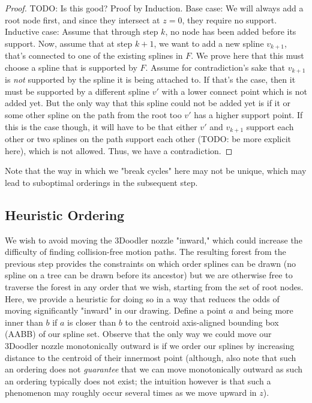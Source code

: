 \documentclass[conference]{acmsiggraph}
\begin{document}
\begin{proof}
TODO: Is this good?
Proof by Induction.
Base case: We will always add a root node first, and since they intersect at $z=0$, they require no support.
Inductive case: Assume that through step $k$, no node has been added before its support.  Now, assume that at step $k+1$, we want to add a new spline $v_{k+1}$, that's connected to one of the existing splines in $F$.  We prove here that this must choose a spline that is supported by $F$.  Assume for contradiction's sake that $v_{k+1}$ is \emph{not} supported by the spline it is being attached to.  If that's the case, then it must be supported by a different spline $v'$ with a lower connect point which is not added yet.  But the only way that this spline could not be added yet is if it or some other spline on the path from the root  too $v'$ has a higher support point.  If this is the case though, it will have to be that either $v'$ and $v_{k+1}$ support each other or two splines on the path support each other (TODO: be more explicit here), which is not allowed.  Thus, we have a contradiction.



\end{proof}

Note that the way in which we "break cycles" here may not be unique, which may lead to suboptimal orderings in the subsequent step.


\subsection{Heuristic Ordering}
We wish to avoid moving the 3Doodler nozzle "inward," which could increase the difficulty of finding collision-free motion paths.  The resulting forest from the previous step provides the constraints on which order splines can be drawn (no spline on a tree can be drawn before its ancestor) but we are otherwise free to traverse the forest in any order that we wish, starting from the set of root nodes.  Here, we provide a heuristic for doing so in a way that reduces the odds of moving significantly "inward" in our drawing.  Define a point $a$ and being more inner than $b$ if $a$ is closer than $b$ to the centroid axis-aligned bounding box (AABB) of our spline set.  Observe that the only way we could move our 3Doodler nozzle monotonically outward is if we order our splines by increasing distance to the centroid of their innermost point (although, also note that such an ordering does not \emph{guarantee} that we can move monotonically outward as such an ordering typically does not exist; the intuition however is that such a phenomenon may roughly occur several times as we move upward in $z$).
\end{document}
